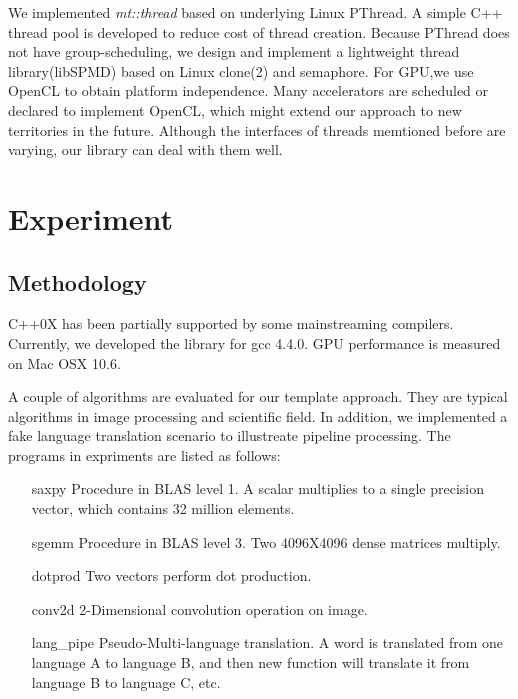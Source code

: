 \documentclass[10pt, conference, compsocconf]{IEEEtran}
\begin{document}
We implemented \emph{mt::thread} based on underlying Linux PThread. A
simple C++ thread pool is developed to reduce cost of thread
creation. Because PThread does not have group-scheduling, we design
and implement a lightweight thread library(libSPMD) based on Linux
clone(2) and semaphore. For GPU,we use OpenCL to obtain platform
independence. Many accelerators are scheduled or declared to
implement OpenCL, which might extend our approach to new
territories in the future.  Although the interfaces of threads
memtioned before  are varying, our library can deal with them well.




\section{Experiment}
\subsection{Methodology}
C++0X has been partially supported by some mainstreaming compilers. Currently, we developed the library for gcc 4.4.0. GPU performance is measured on Mac OSX 10.6. 

A couple of algorithms are evaluated for our template approach.  They
are typical algorithms in image processing and scientific field. In
addition, we implemented a fake language translation scenario to
illustreate pipeline processing. The programs in expriments are listed
as follows:

\begin{itemize}
\item[saxpy] Procedure in BLAS level 1. A scalar multiplies to a single precision vector, which contains 32 million elements.
\item[sgemm] Procedure in BLAS level 3. Two 4096X4096 dense matrices multiply.
\item[dotprod] Two vectors perform dot production.
\item[conv2d] 2-Dimensional convolution operation on image.
\item[lang\_pipe] Pseudo-Multi-language translation. A word is translated from one language A to language B, and then new function will translate it from language B to language C, etc.
\end{itemize}
\end{document}

